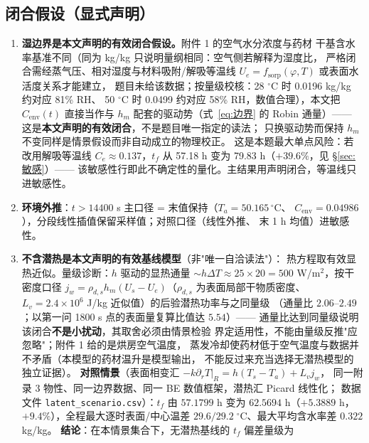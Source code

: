 \documentclass[12pt,a4paper]{ctexart}
\numberwithin{equation}{section}
\begin{document}
\subsection{闭合假设（显式声明）}\label{sec:闭合}
\begin{enumerate}
  \item \textbf{湿边界是本文声明的有效闭合假设。}附件 1 的空气水分浓度与药材
        干基含水率基准不同（同为 kg/kg 只说明量纲相同：空气侧若解释为湿度比，
        严格闭合需经蒸气压、相对湿度与材料吸附/解吸等温线
        $U_e=f_{\mathrm{sorp}}(\varphi,T)$ 或表面水活度关系才能建立，
        题目未给该数据；按量级校核：28 ${}^\circ$C 时 0.0196 kg/kg 约对应 81\% RH、
        50 ${}^\circ$C 时 0.0499 约对应 58\% RH，数值合理），本文把 $C_{\mathrm{env}}(t)$
        直接当作与 $h_m$ 配套的驱动势（式~\eqref{eq:边界} 的 Robin 通量）——
        这是\textbf{本文声明的有效闭合}，不是题目唯一指定的读法；
        只换驱动势而保持 $h_m$ 不变同样是情景假设而非自动成立的物理校正。
        这是本题最大单点风险：若改用解吸等温线
        $C_e\approx0.137$，$t_f$ 从 57.18 h 变为 79.83 h（$+39.6\%$，见 \S\ref{sec:敏感}）——
        该敏感性行即此不确定性的量化。主结果用声明闭合，等温线只进敏感性。
  \item \textbf{环境外推}：$t>14400$ s 主口径 = 末值保持（$T_a=50.165\,^{\circ}$C、
        $C_{\mathrm{env}}=0.04986$），分段线性插值保留采样值；对照口径（线性外推、
        末 1 h 均值）进敏感性。
  \item \textbf{不含潜热是本文声明的有效基线模型}（非"唯一自洽读法"）：
        热方程取有效显热近似。量级诊断：$h$ 驱动的显热通量
        $\sim h\Delta T\approx25\times20=500$ W/m$^2$，按干密度口径
        $j_w=\rho_{d,s}h_m(U_s-U_e)$（$\rho_{d,s}$ 为表面局部干物质密度、
        $L_v=2.4\times10^6$ J/kg 近似值）的后验潜热功率与之同量级
        （通量比 $2.06$--$2.49$；以第一问 1800 s 点的表面量复算比值达 $5.54$）——
        通量比达到同量级说明该闭合\textbf{不是小扰动}，其取舍必须由情景检验
        界定适用性，不能由量级反推"应忽略"；附件 1 给的是烘房空气温度，
        蒸发冷却使药材低于空气温度与数据并不矛盾（本模型的药材温升是模型输出，
        不能反过来充当选择无潜热模型的独立证据）。
        \textbf{对照情景}（表面相变汇 $-k\partial_rT|_R=h(T_s-T_a)+L_vj_w$，
        同一附录 3 物性、同一边界数据、同一 BE 数值框架，潜热汇 Picard 线性化；
        数据文件 \texttt{latent\_scenario.csv}）：$t_f$ 由 $57.1799$ h 变为
        $62.5694$ h（$+5.3889$ h，$+9.4\%$），全程最大逐时表面/中心温差
        $29.6/29.2\;^\circ$C、最大平均含水率差 $0.322$ kg/kg。
        \textbf{结论}：在本情景集合下，无潜热基线的 $t_f$ 偏差量级为

\end{enumerate}
\end{document}
